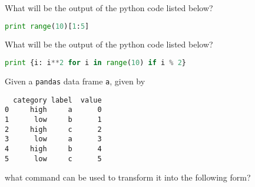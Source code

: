 \documentclass[a4paper,11pt,english,plainsub]{uioexam}
\begin{document}
\tableofcontents

\bigskip






What will be the output of the python code listed below?

\begin{lstlisting}[language=Python]
print range(10)[1:5]  
\end{lstlisting}

\begin{choicelist}
  \choice {\tt [1, 2, 3, 4, 5]}
  \choice {\tt [0, 1, 2, 3, 4, 5]}
  \choice {\tt [1, 2, 3, 4]}
  \choice {\tt [0, 1, 2, 3, 4]}
\end{choicelist}


What will be the output of the python code listed below?

\begin{lstlisting}[language=Python]
print {i: i**2 for i in range(10) if i % 2}
\end{lstlisting}

\begin{choicelist}
  \choice {\tt [1, 9, 25, 49, 81]}
\end{choicelist}



Given a {\tt pandas} data frame {\tt a}, given by

\begin{verbatim}
  category label  value
0     high     a      0
1      low     b      1
2     high     c      2
3      low     a      3
4     high     b      4
5      low     c      5
\end{verbatim}

what command can be used to transform it into the following form?
\end{document}
